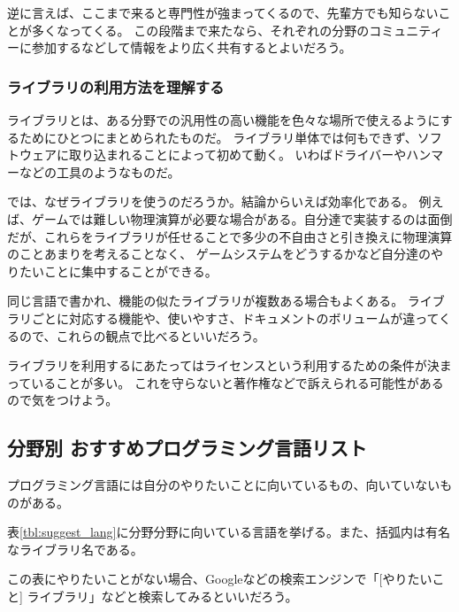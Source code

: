 \documentclass[lualatex,ja=standard,12pt,a4j]{bxjsbook}
\begin{document}
	                逆に言えば、ここまで来ると専門性が強まってくるので、先輩方でも知らないことが多くなってくる。
	                この段階まで来たなら、それぞれの分野のコミュニティーに参加するなどして情報をより広く共有するとよいだろう。
					
				\subsubsection{ライブラリの利用方法を理解する}
			        ライブラリとは、ある分野での汎用性の高い機能を色々な場所で使えるようにするためにひとつにまとめられたものだ。
			        ライブラリ単体では何もできず、ソフトウェアに取り込まれることによって初めて動く。
			        いわばドライバーやハンマーなどの工具のようなものだ。
			        
			        では、なぜライブラリを使うのだろうか。結論からいえば効率化である。
			        例えば、ゲームでは難しい物理演算が必要な場合がある。自分達で実装するのは面倒だが、これらをライブラリが任せることで多少の不自由さと引き換えに物理演算のことあまりを考えることなく、
			        ゲームシステムをどうするかなど自分達のやりたいことに集中することができる。
			        
			        同じ言語で書かれ、機能の似たライブラリが複数ある場合もよくある。
			        ライブラリごとに対応する機能や、使いやすさ、ドキュメントのボリュームが違ってくるので、これらの観点で比べるといいだろう。 
			        
			        ライブラリを利用するにあたってはライセンスという利用するための条件が決まっていることが多い。
			        これを守らないと著作権などで訴えられる可能性があるので気をつけよう。
			\subsection{分野別 おすすめプログラミング言語リスト}
				プログラミング言語には自分のやりたいことに向いているもの、向いていないものがある。
				
				表\ref{tbl:suggest_lang}に分野分野に向いている言語を挙げる。また、括弧内は有名なライブラリ名である。
				
				この表にやりたいことがない場合、Googleなどの検索エンジンで「[やりたいこと] ライブラリ」などと検索してみるといいだろう。
				
\end{document}
